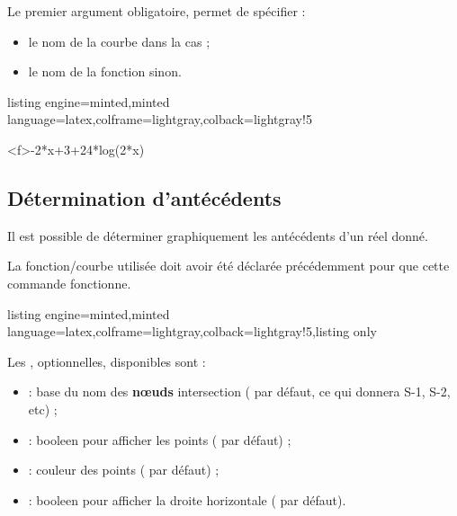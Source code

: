 \documentclass[11pt,a4paper]{ltxdoc}
\begin{document}
\smallskip

Le premier argument obligatoire, permet de spécifier :

\smallskip

\begin{itemize}
	\item le nom de la courbe dans la cas  ;
	\item le nom de la fonction sinon.
\end{itemize}

\begin{tcblisting}{listing engine=minted,minted language=latex,colframe=lightgray,colback=lightgray!5}
\begin{GraphiqueTikz}%
	[x=0.9cm,y=0.425cm,Xmin=4,Xmax=20,Origx=4,
	Ymin=40,Ymax=56,Ygrille=2,Ygrilles=1,Origy=40]
	{-2*x+3+24*log(2*x)}
\end{GraphiqueTikz}
\end{tcblisting}

\pagebreak

\subsection{Détermination d'antécédents}\label{defanteced}

Il est possible de déterminer graphiquement les antécédents d'un réel donné.

La fonction/courbe utilisée doit avoir été déclarée précédemment pour que cette commande fonctionne.

\begin{tcblisting}{listing engine=minted,minted language=latex,colframe=lightgray,colback=lightgray!5,listing only}
\end{tcblisting}

Les \MontreCode{[clés]}, optionnelles, disponibles sont :

\smallskip

\begin{itemize}
	\item {} : base du nom des \textbf{nœuds} intersection ( par défaut, ce qui donnera \textsf{S-1}, \textsf{S-2}, etc) ;
	\item {} : booleen pour afficher les points ( par défaut) ;
	\item {} : couleur des points ( par défaut) ;
	\item {} : booleen pour afficher la droite horizontale ( par défaut).
\end{itemize}
\end{document}
